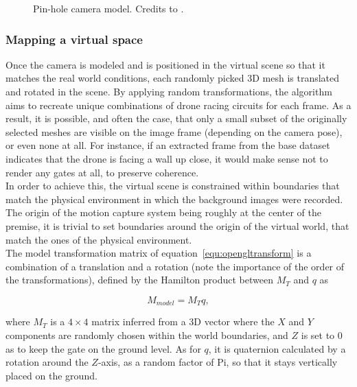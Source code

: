 \begin{figure}[h]
	\center
	\resizebox{240pt}{!}{
		
	}
	\caption[Pin-hole camera model]{Pin-hole camera model. Credits to
	\cite{cfr}.}
	\label{fig:pinholemodel}
\end{figure}


	\subsubsection{Mapping a virtual space}

Once the camera is modeled and is positioned in the virtual scene so
that it matches the real world conditions, each randomly picked 3D mesh is
translated and rotated in the scene. By applying random transformations, the
algorithm aims to recreate unique combinations of drone racing circuits for
each frame. As a result, it is possible, and often the case, that only a small
subset of the originally selected meshes are visible on the image frame
(depending on the camera pose), or even none at all. For instance, if an
extracted frame from the base dataset indicates that the drone is facing a wall
up close, it would make sense not to render any gates at all, to preserve
coherence.\\

In order to achieve this, the virtual scene is constrained within boundaries
that match the physical environment in which the background images were
recorded. The origin of the motion capture system being roughly at the center
of the premise, it is trivial to set boundaries around the origin of the
virtual world, that match the ones of the physical environment.\\

The model transformation matrix of equation~\ref{equ:opengltransform} is a
combination of a translation and a rotation (note the importance of the order
of the transformations), defined by the Hamilton product between $M_T$ and $q$
as

\begin{equation} \label{equ:modelmatrix}
	M_{model} = M_T q,
\end{equation}

where $M_T$ is a $4 \times 4$ matrix inferred from a 3D vector where the $X$
and $Y$ components are randomly chosen within the world boundaries, and $Z$ is
set to 0 as to keep the gate on the ground level. As for $q$, it is quaternion
calculated by a rotation around the $Z$-axis, as a random factor of Pi, so that
it stays vertically placed on the ground.

